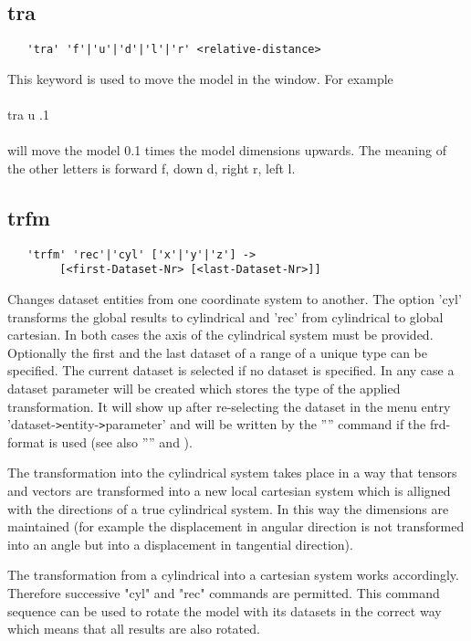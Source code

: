\documentclass{article}
\begin{document}
\subsection{\label{tra}tra}
\begin{verbatim}
   'tra' 'f'|'u'|'d'|'l'|'r' <relative-distance>
\end{verbatim}
This keyword is used to move the model in the window. For example\\\\tra u .1\\\\will move the model 0.1 times the model dimensions upwards. The meaning of the other letters is forward f, down d, right r, left l. 

\subsection{\label{trfm}trfm}
\begin{verbatim}
   'trfm' 'rec'|'cyl' ['x'|'y'|'z'] ->
        [<first-Dataset-Nr> [<last-Dataset-Nr>]]
\end{verbatim}
Changes dataset entities from one coordinate system to another. The option
'cyl' transforms the global results to cylindrical and 'rec' from cylindrical
to global cartesian. In both cases the axis of the cylindrical system must be
provided. Optionally the first and the last dataset of a range of a unique
type can be specified. The current dataset is selected if no dataset is
specified. In any case a dataset parameter will be created which stores the type of the applied transformation. It will show up after re-selecting the dataset in the menu entry 'dataset-\verb_>_entity-\verb_>_parameter' and will be written by the '''' command if the frd-format is used (see also '''' and ).

The transformation into the cylindrical system takes place in a way that tensors and vectors are transformed into a new local cartesian system which is alligned with the directions of a true cylindrical system. In this way the dimensions are maintained (for example the displacement in angular direction is not transformed into an angle but into a displacement in tangential direction).

The transformation from a cylindrical into a cartesian system works accordingly. Therefore successive "cyl" and "rec" commands are permitted. This command sequence can be used to rotate the model with its datasets in the correct way which means that all results are also rotated.
\end{document}
